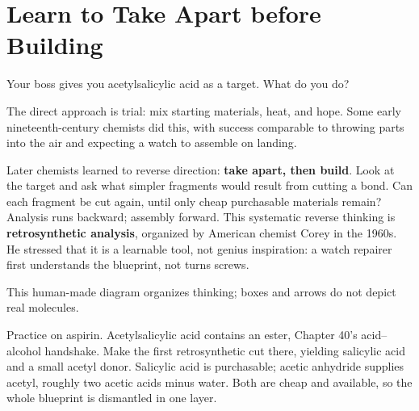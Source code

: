 \section{Learn to Take Apart before Building}

Your boss gives you acetylsalicylic acid as a target. What do you do?

The direct approach is trial: mix starting materials, heat, and hope. Some early nineteenth-century chemists did this, with success comparable to throwing parts into the air and expecting a watch to assemble on landing.

Later chemists learned to reverse direction: \textbf{take apart, then build}. Look at the target and ask what simpler fragments would result from cutting a bond. Can each fragment be cut again, until only cheap purchasable materials remain? Analysis runs backward; assembly forward. This systematic reverse thinking is \textbf{retrosynthetic analysis}, organized by American chemist Corey in the 1960s. He stressed that it is a learnable tool, not genius inspiration: a watch repairer first understands the blueprint, not turns screws.

\begin{center}
\end{center}

This human-made diagram organizes thinking; boxes and arrows do not depict real molecules.

Practice on aspirin. Acetylsalicylic acid contains an ester, Chapter 40's acid--alcohol handshake. Make the first retrosynthetic cut there, yielding salicylic acid and a small acetyl donor. Salicylic acid is purchasable; acetic anhydride supplies acetyl, roughly two acetic acids minus water. Both are cheap and available, so the whole blueprint is dismantled in one layer.


